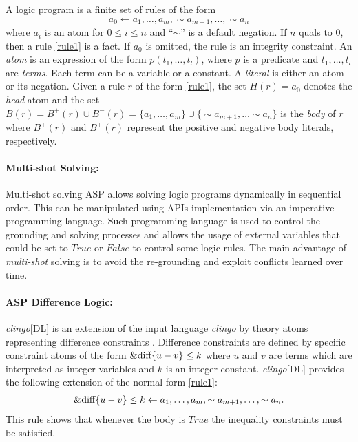 \documentclass[runningheads]{llncs}
\begin{document}
A logic program is a finite set of rules of the form 
\begin{equation}
	a_0 \gets a_1, \ldots, a_m, \sim a_{m+1}, \dots, \sim a_n
	\label{rule1}
\end{equation}
where $a_i$ is an atom for $0 \leq i \leq n$ and ``$\sim$''  is a default negation. If $n$ quals to $0$, then a rule \eqref{rule1} is a fact. If $a_0$ is omitted, the rule is an integrity constraint. An \emph{atom} is an expression of the form $p(t_1,\ldots,t_l)$, where $p$ is a predicate and $t_1,\ldots,t_l$ are \emph{terms}. Each term can be a variable or a constant. A \emph{literal} is either an atom or its negation. 
Given a rule $r$ of the form \eqref{rule1}, the set $H(r)=a_0$ denotes the \emph{head} atom and the set $B(r) = B^+(r) \cup B^-(r) = \{a_1,\dots,a_m\} \cup \{\sim a_{m+1}, \dots \sim a_n\}$ is the \emph{body} of $r$ where $B^+(r)$ and $B^+(r)$ represent the positive and negative body literals, respectively.
\paragraph{Multi-shot Solving:}
Multi-shot solving ASP allows solving logic programs dynamically in sequential order. This can be manipulated using APIs implementation via an imperative programming language. Such programming language is used to control the grounding and solving processes and allows the usage of external variables that could be set to $True$ or $False$ to control some logic rules. The main advantage of \emph{multi-shot} solving is to avoid the re-grounding and exploit conflicts learned over time.
\paragraph{ASP Difference Logic:}
\emph{clingo}[DL] is an extension of the input language \emph{clingo} by theory atoms representing difference constraints \cite{gebser2016theory,janhunen2017clingo}. Difference constraints are defined by specific constraint atoms of the form $\text{\lstinline{&diff}}\{u-v\} \leq k$ where $u$ and $v$ are terms which are interpreted as integer variables and $k$ is an integer constant. \emph{clingo}[DL] provides the following extension of the normal form \eqref{rule1}: 
\begin{align*}
	\text{\lstinline{&diff}}\{u-v\} \leq k \gets a_1, \ldots, a_m, \sim a_{m+1}, \ldots, \sim a_n.
\end{align*}
 This rule shows that whenever the body is $True$ the inequality constraints must be satisfied.
\end{document}
